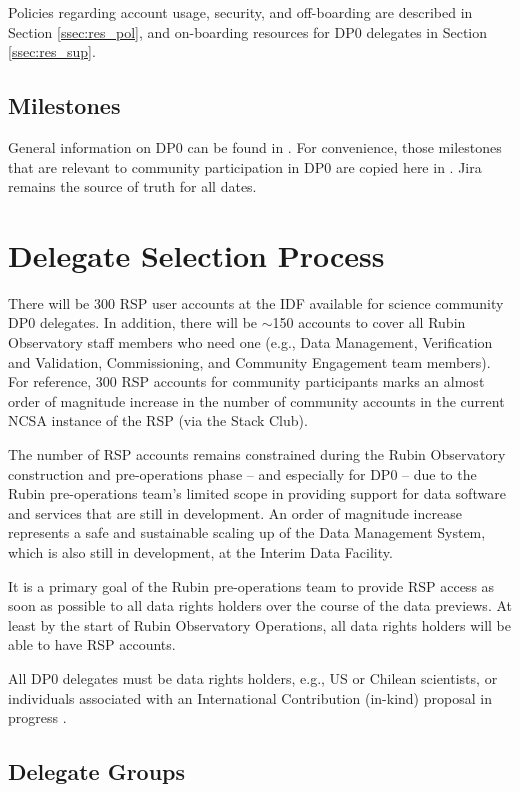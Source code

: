 \documentclass[DM,lsstdraft,authoryear,toc]{lsstdoc}
\begin{document}
Policies regarding account usage, security, and off-boarding are described in Section \ref{ssec:res_pol}, and on-boarding resources for DP0 delegates in Section \ref{ssec:res_sup}. 

\subsection{Milestones}
General  information on DP0 can be found in .
For convenience, those milestones  that are relevant to community participation in DP0 are copied here in . 
Jira remains the source of truth for all dates. 


\section{Delegate Selection Process}\label{sec:sel}

There will be 300 RSP user accounts at the IDF available for science community DP0 delegates.
In addition, there will be $\sim$150 accounts to cover all Rubin Observatory staff members who need one (e.g., Data Management, Verification and Validation, Commissioning, and Community Engagement team members).
For reference, 300 RSP accounts for community participants marks an almost order of magnitude increase in the number of community accounts in the current NCSA instance of the RSP (via the Stack Club).

The number of RSP accounts remains constrained during the Rubin Observatory construction and pre-operations phase -- and especially for DP0 -- due to the Rubin pre-operations team's limited scope in providing support for data software and services that are still in development.
An order of magnitude increase represents a safe and sustainable scaling up of the Data Management System, which is also still in development, at the Interim Data Facility.

It is a primary goal of the Rubin pre-operations team to provide RSP access as soon as possible to all data rights holders over the course of the data previews. 
At least by the start of Rubin Observatory Operations, all data rights holders will be able to have RSP accounts.

All DP0 delegates must be data rights holders, e.g., US or Chilean scientists, or individuals associated with an International Contribution (in-kind) proposal in progress .

\subsection{Delegate Groups}\label{ssec:sel_grps}
\end{document}
